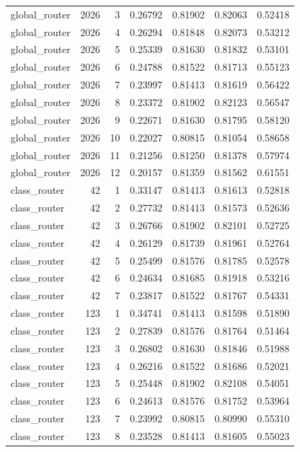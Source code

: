 \begin{tabular}{lrrrrrr}
global_router & 2026 & 3 & 0.26792 & 0.81902 & 0.82063 & 0.52418 \\
global_router & 2026 & 4 & 0.26294 & 0.81848 & 0.82073 & 0.53212 \\
global_router & 2026 & 5 & 0.25339 & 0.81630 & 0.81832 & 0.53101 \\
global_router & 2026 & 6 & 0.24788 & 0.81522 & 0.81713 & 0.55123 \\
global_router & 2026 & 7 & 0.23997 & 0.81413 & 0.81619 & 0.56422 \\
global_router & 2026 & 8 & 0.23372 & 0.81902 & 0.82123 & 0.56547 \\
global_router & 2026 & 9 & 0.22671 & 0.81630 & 0.81795 & 0.58120 \\
global_router & 2026 & 10 & 0.22027 & 0.80815 & 0.81054 & 0.58658 \\
global_router & 2026 & 11 & 0.21256 & 0.81250 & 0.81378 & 0.57974 \\
global_router & 2026 & 12 & 0.20157 & 0.81359 & 0.81562 & 0.61551 \\
class_router & 42 & 1 & 0.33147 & 0.81413 & 0.81613 & 0.52818 \\
class_router & 42 & 2 & 0.27732 & 0.81413 & 0.81573 & 0.52636 \\
class_router & 42 & 3 & 0.26766 & 0.81902 & 0.82101 & 0.52725 \\
class_router & 42 & 4 & 0.26129 & 0.81739 & 0.81961 & 0.52764 \\
class_router & 42 & 5 & 0.25499 & 0.81576 & 0.81785 & 0.52578 \\
class_router & 42 & 6 & 0.24634 & 0.81685 & 0.81918 & 0.53216 \\
class_router & 42 & 7 & 0.23817 & 0.81522 & 0.81767 & 0.54331 \\
class_router & 123 & 1 & 0.34741 & 0.81413 & 0.81598 & 0.51890 \\
class_router & 123 & 2 & 0.27839 & 0.81576 & 0.81764 & 0.51464 \\
class_router & 123 & 3 & 0.26802 & 0.81630 & 0.81846 & 0.51988 \\
class_router & 123 & 4 & 0.26216 & 0.81522 & 0.81686 & 0.52021 \\
class_router & 123 & 5 & 0.25448 & 0.81902 & 0.82108 & 0.54051 \\
class_router & 123 & 6 & 0.24613 & 0.81576 & 0.81752 & 0.53964 \\
class_router & 123 & 7 & 0.23992 & 0.80815 & 0.80990 & 0.55310 \\
class_router & 123 & 8 & 0.23528 & 0.81413 & 0.81605 & 0.55023 \\

\end{tabular}
